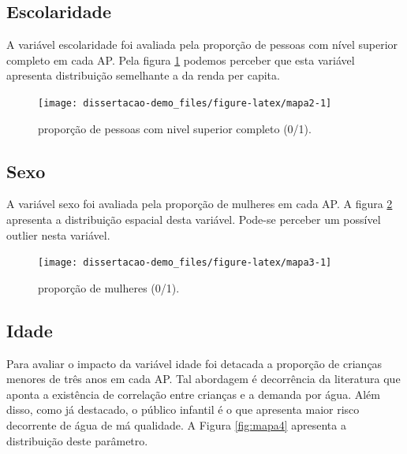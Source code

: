 \documentclass[
  12pt,
]{book}
\begin{document}
\newpage

\hypertarget{escolaridade}{%
\subsection{Escolaridade}\label{escolaridade}}

A variável escolaridade foi avaliada pela proporção de pessoas com nível superior completo em cada AP. Pela figura \ref{fig:mapa2} podemos perceber que esta variável apresenta distribuição semelhante a da renda per capita.

\begin{figure}

{\centering \texttt{[image: dissertacao-demo\_files/figure-latex/mapa2-1]} 

}

\caption{proporção de pessoas com nivel superior completo (0/1).}\label{fig:mapa2}
\end{figure}

\newpage

\hypertarget{sexo}{%
\subsection{Sexo}\label{sexo}}

A variável sexo foi avaliada pela proporção de mulheres em cada AP. A figura \ref{fig:mapa3} apresenta a distribuição espacial desta variável. Pode-se perceber um possível outlier nesta variável.

\begin{figure}

{\centering \texttt{[image: dissertacao-demo\_files/figure-latex/mapa3-1]} 

}

\caption{proporção de mulheres (0/1).}\label{fig:mapa3}
\end{figure}

\newpage

\hypertarget{idade}{%
\subsection{Idade}\label{idade}}

Para avaliar o impacto da variável idade foi detacada a proporção de crianças menores de três anos em cada AP. Tal abordagem é decorrência da literatura que aponta a existência de correlação entre crianças e a demanda por água. Além disso, como já destacado, o público infantil é o que apresenta maior risco decorrente de água de má qualidade. A Figura \ref{fig:mapa4} apresenta a distribuição deste parâmetro.
\end{document}
